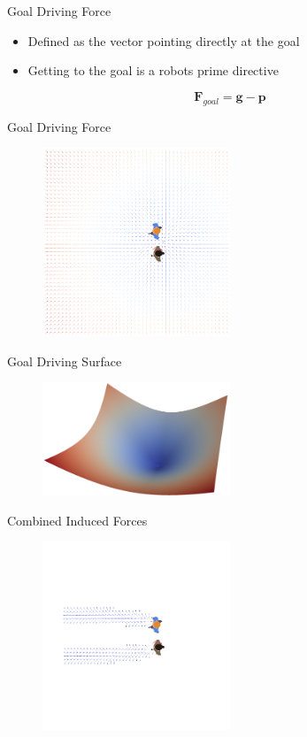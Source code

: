 \documentclass[aspectratio=169,xcolor=dvipsnames]{beamer}
\begin{document}
\begin{frame}{Goal Driving Force}
  \begin{itemize}
    \item Defined as the vector pointing directly at the goal
    \item Getting to the goal is a robots prime directive
  \end{itemize}
  \[
    \mathbf{F}_{goal} = \mathbf{g} - \mathbf{p}
  \]
\end{frame}

\begin{frame}{Goal Driving Force}
  \begin{figure}
    \includegraphics[width=0.5\textwidth]{imgs/goal_directed_force.png}
  \end{figure}
\end{frame}

\begin{frame}{Goal Driving Surface}
  \begin{figure}
    \includegraphics[width=0.5\textwidth]{imgs/goal_surface.png}
  \end{figure}
\end{frame}

\begin{frame}{Combined Induced Forces}
  \begin{figure}
    \includegraphics[width=0.5\textwidth]{imgs/combined_forces.png}
  \end{figure}
\end{frame}
\end{document}
